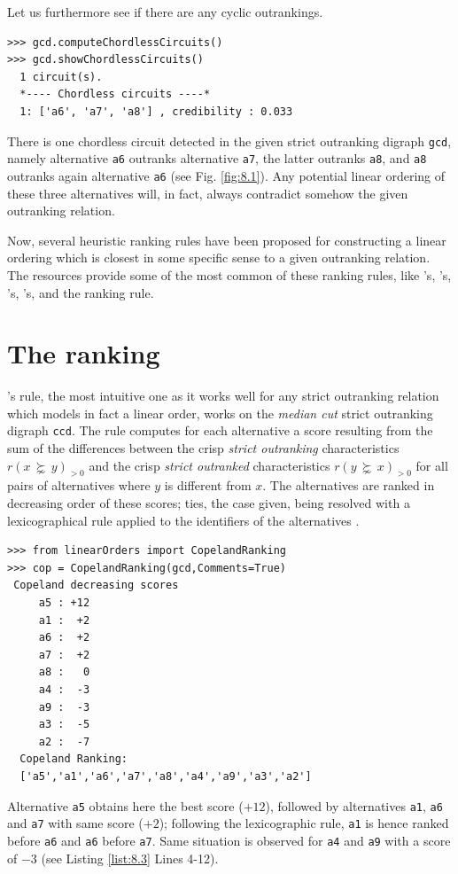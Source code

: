 Let us furthermore see if there are any cyclic outrankings.
\begin{lstlisting}
>>> gcd.computeChordlessCircuits()
>>> gcd.showChordlessCircuits()
  1 circuit(s).
  *---- Chordless circuits ----*    
  1: ['a6', 'a7', 'a8'] , credibility : 0.033
\end{lstlisting}
There is one chordless circuit detected in the given strict outranking digraph \texttt{gcd}, namely alternative \texttt{a6} outranks alternative \texttt{a7}, the latter outranks \texttt{a8}, and \texttt{a8} outranks again alternative \texttt{a6} (see Fig. \ref{fig:8.1}). Any potential linear ordering of these three alternatives will, in fact, always contradict somehow the given outranking relation.

Now, several heuristic ranking rules have been proposed for constructing a linear ordering which is closest in some specific sense to a given outranking relation. The \Digraph resources provide some of the most common of these ranking rules, like \Copeland 's, \Kemeny 's, \Slater 's, \Kohler 's, and the \RankedPairs ranking rule.

\section{The \Copeland ranking}
\label{sec:8.2}

\Copeland 's rule, the most intuitive one as it works well for any strict outranking relation which models in fact a linear order, works on the \emph{median cut} strict outranking digraph \texttt{ccd}. The rule computes for each alternative a score resulting from the sum of the differences between the crisp \emph{strict outranking} characteristics $r(x\, \succnsim \,y)_{>0}$ and the crisp \emph{strict outranked} characteristics $r(y\, \succnsim \, x)_{>0}$  for all pairs of alternatives where $y$ is different from $x$. The alternatives are ranked in decreasing order of these \Copeland scores; ties, the case given, being resolved with a lexicographical rule applied to the identifiers of the alternatives \citep{COP-1951}. 

\begin{lstlisting}[caption={Computing a \Copeland Ranking},label=list:8.3]
>>> from linearOrders import CopelandRanking
>>> cop = CopelandRanking(gcd,Comments=True)
 Copeland decreasing scores
     a5 : +12
     a1 :  +2
     a6 :  +2
     a7 :  +2
     a8 :   0
     a4 :  -3
     a9 :  -3
     a3 :  -5
     a2 :  -7
  Copeland Ranking:
  ['a5','a1','a6','a7','a8','a4','a9','a3','a2']
\end{lstlisting}
Alternative \texttt{a5} obtains here the best \Copeland score ($+12$), followed by alternatives \texttt{a1}, \texttt{a6} and \texttt{a7} with same score ($+2$); following the lexicographic rule, \texttt{a1} is hence ranked before \texttt{a6} and \texttt{a6} before \texttt{a7}. Same situation is observed for \texttt{a4} and \texttt{a9} with a score of $-3$ (see Listing \ref{list:8.3} Lines 4-12).

